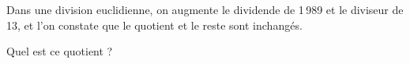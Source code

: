 
Dans une division euclidienne, on  augmente le dividende de 1\,989 et le
diviseur de  13, et  l'on constate  que le quotient  et le  reste sont
inchangés. 
\par Quel est ce quotient ? 
